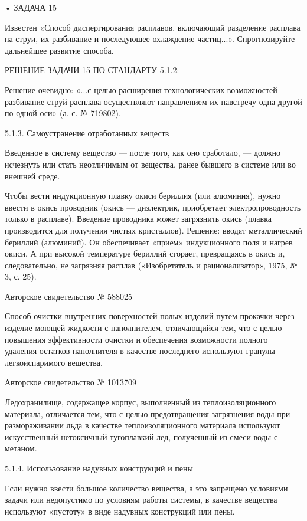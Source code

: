 • ЗАДАЧА 15

Известен  «Способ  диспергирования  расплавов,  включающий  разделение
расплава на струи, их  разбивание и последующее охлаждение частиц...».
Спрогнозируйте дальнейшее развитие способа.


РЕШЕНИЕ ЗАДАЧИ 15 ПО СТАНДАРТУ 5.1.2:

Решение очевидно: «...с  целью расширения технологических возможностей
разбивание струй расплава осуществляют  направлением их навстречу одна
другой по одной оси» (а. с. № 719802).


5.1.3. Самоустранение отработанных веществ

Введенное в систему вещество — после того, как оно сработало, — должно
исчезнуть или стать  неотличимым от вещества, ранее  бывшего в системе
или во внешней среде.

Чтобы  вести  индукционную  плавку   окиси  бериллия  (или  алюминия),
нужно  ввести  в  окись  проводник (окись  —  диэлектрик,  приобретает
электропроводность  только  в  расплаве).  Введение  проводника  может
загрязнить   окись   (плавка   производится   для   получения   чистых
кристаллов).  Решение: вводят  металлический  бериллий (алюминий).  Он
обеспечивает «прием» индукционного поля и  нагрев окиси. А при высокой
температуре бериллий сгорает, превращаясь в  окись и, следовательно, не
загрязняя расплав («Изобретатель и рационализатор», 1975, № 3, с. 25).


Авторское свидетельство № 588025

Способ очистки  внутренних поверхностей  полых изделий  путем прокачки
через изделие  моющей жидкости  с наполнителем, отличающийся  тем, что
с  целью повышения  эффективности  очистки  и обеспечения  возможности
полного удаления остатков наполнителя в качестве последнего используют
гранулы легкоиспаримого вещества.


Авторское свидетельство № 1013709

Ледохранилище,  содержащее корпус,  выполненный из  теплоизоляционного
материала,  отличается тем,  что  с  целью предотвращения  загрязнения
воды при  размораживании льда в качестве  теплоизоляционного материала
используют  искусственный нетоксичный  тугоплавкий лед,  полученный из
смеси воды с метаном.


5.1.4. Использование надувных конструкций и пены

Если  нужно  ввести  большое  количество  вещества,  а  это  запрещено
условиями  задачи  или  недопустимо  по  условиям  работы  системы,  в
качестве вещества используют «пустоту» в виде надувных конструкций или
пены.


